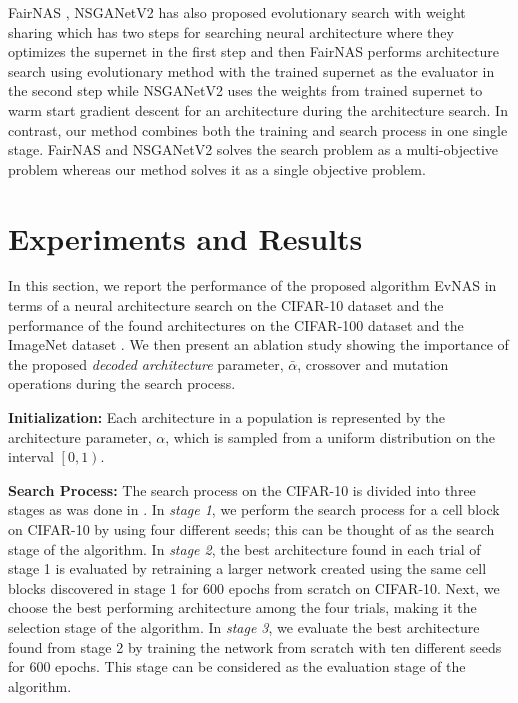 \documentclass[final]{cvpr}
\begin{document}
FairNAS \cite{chu2019fairnas}, NSGANetV2 \cite{lu2020nsganetv2} has also proposed evolutionary search
with weight sharing which has two steps for searching neural architecture where they optimizes the
supernet in the first step and then FairNAS performs architecture search using evolutionary method with
the trained supernet as the evaluator in the second step while NSGANetV2 uses the weights from trained
supernet to warm start gradient descent for an architecture during the architecture search. In
contrast, our method combines both the training and search process in one single stage.
FairNAS and NSGANetV2 solves the search problem as a multi-objective problem whereas our method solves
it as a single objective problem.

\section{Experiments and Results}
\label{experiments}
In this section, we report the performance of the proposed algorithm EvNAS in terms of a neural 
architecture search on the CIFAR-10 dataset \cite{krizhevsky2009learning} and the performance of
the found architectures on the CIFAR-100 dataset \cite{krizhevsky2009learning} and the
ImageNet dataset \cite{imagenet_cvpr09}. We then present an ablation study showing the importance
of the proposed \textit{decoded architecture} parameter, $\bar{\alpha}$, crossover and
mutation operations during the search process.

\textbf{Initialization:} Each architecture in a population is represented by the architecture
parameter, $\alpha$, which is sampled from a uniform distribution on the interval
$\left[0,1\right)$.

\textbf{Search Process:} The search process on the CIFAR-10 is divided into three stages as was done in
\cite{liu2018darts2}\cite{li2019random}. In \textit{stage 1}, we perform the search process for a
cell block on CIFAR-10 by using four different seeds; this can be thought of as the search stage
of the algorithm. In \textit{stage 2}, the best architecture found in each trial of stage 1 is
evaluated by retraining a larger network created using the same cell blocks discovered in stage 1
for 600 epochs from scratch on CIFAR-10. Next, we choose the best performing architecture among
the four trials, making it the selection stage of the algorithm. In \textit{stage 3}, we evaluate
the best architecture found from stage 2 by training the network from scratch with ten different
seeds for 600 epochs. This stage can be considered as the evaluation stage of the algorithm.
\end{document}
